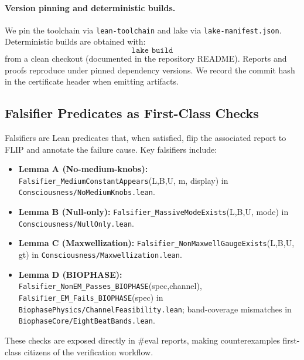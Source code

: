 \documentclass[12pt,a4paper]{article}
\begin{document}
\paragraph{Version pinning and deterministic builds.}
We pin the toolchain via \texttt{lean-toolchain} and lake via \texttt{lake-manifest.json}. Deterministic builds are obtained with:
\[
  \texttt{lake\ build}
\]
from a clean checkout (documented in the repository README). Reports and proofs reproduce under pinned dependency versions. We record the commit hash in the certificate header when emitting artifacts.

\subsection{Falsifier Predicates as First-Class Checks}
Falsifiers are Lean predicates that, when satisfied, flip the associated report to FLIP and annotate the failure cause. Key falsifiers include:
\begin{itemize}
  \item \textbf{Lemma A (No-medium-knobs):} \texttt{Falsifier\_MediumConstantAppears}(L,B,U, m, display) in \texttt{Consciousness/NoMediumKnobs.lean}.
  \item \textbf{Lemma B (Null-only):} \texttt{Falsifier\_MassiveModeExists}(L,B,U, mode) in \texttt{Consciousness/NullOnly.lean}.
  \item \textbf{Lemma C (Maxwellization):} \texttt{Falsifier\_NonMaxwellGaugeExists}(L,B,U, gt) in \texttt{Consciousness/Maxwellization.lean}.
  \item \textbf{Lemma D (BIOPHASE):} \texttt{Falsifier\_NonEM\_Passes\_BIOPHASE}(spec,channel), \texttt{Falsifier\_EM\_Fails\_BIOPHASE}(spec) in \texttt{BiophasePhysics/ChannelFeasibility.lean}; band-coverage mismatches in \texttt{BiophaseCore/EightBeatBands.lean}.
\end{itemize}
These checks are exposed directly in \#eval reports, making counterexamples first-class citizens of the verification workflow.
\end{document}
